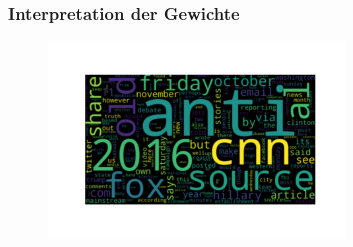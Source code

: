 \documentclass[aspectratio=1610, professionalfonts, 9pt]{beamer}
\begin{document}
  \begin{frame}
    \frametitle{Interpretation der Gewichte}
    \begin{figure}
          \includegraphics[width=0.7\textwidth]{pictures/bow/weights_wordcloud.pdf}
          \caption{}
          \label{}
      \end{figure}
  \end{frame}
\end{document}
